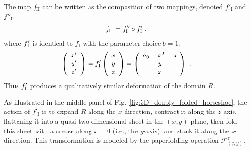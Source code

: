 \documentclass[12pt]{iopart}
\begin{document}
The map \( f_{\mathrm{II}} \) can be written as the composition of two mappings, denoted \( f'_{\mathrm{I}} \) and \( f''_{\mathrm{I}} \), 
\begin{equation}\label{eq:3D doubly folded Henon compound}
f_{\rm II} = f^{\prime\prime}_{\rm I} \circ f^{\prime}_{\rm I}\ ,
\end{equation}
where $f^{\prime}_{\rm I}$ is identical to \( f_{\mathrm{I}} \) with the parameter choice \( b = 1 \),
\begin{equation}\label{eq:f prime I}
\left( \begin{array}{ccc}
x^{\prime}\\
y^{\prime} \\
z^{\prime} \end{array} \right) = 
f^{\prime}_{\rm I} \left( \begin{array}{ccc}
x\\
y \\
z \end{array} \right) =
\left( \begin{array}{ccc}
a_0 - x^2 - z\\
y \\
x \end{array} \right)\ .
\end{equation}
Thus $f^{\prime}_{\rm I}$ produces a qualitatively similar deformation of the domain \( R \). 

As illustrated in the middle panel of Fig.~\ref{fig:3D_doubly_folded_horseshoe}, the action of \( f'_{\mathrm{I}} \) is to expand \( R \) along the \( x \)-direction, contract it along the \( z \)-axis, flattening it into a quasi-two-dimensional sheet in the \( (x,y) \)-plane, then fold this sheet with a crease along \( x = 0 \) (i.e., the \( y \)-axis), and stack it along the \( z \)-direction. This transformation is modeled by the paperfolding operation \( \mathcal{F}^z_{(\underline{x},y)} \).
\end{document}
